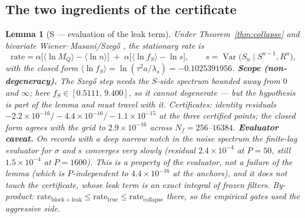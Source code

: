 \documentclass[11pt]{article}
\newtheorem{lemma}{Lemma}
\theoremstyle{definition}
\theoremstyle{remark}
\begin{document}
\subsection{The two ingredients of the certificate}

\begin{lemma}[S --- evaluation of the leak term]
\label{lem:S}
Under Theorem~\ref{thm:collapse} and bivariate Wiener--Masani/Szeg\H o
\cite{bib:wm57,bib:wm58,bib:hl58},
the stationary rate is
\[
\mathrm{rate}=\alpha\bigl[\langle\ln M_Q\rangle-\langle\ln
n\rangle\bigr]
\;+\;\alpha\bigl[\langle\ln f_S\rangle-\ln s\bigr],
\qquad s=\operatorname{Var}\bigl(S_u\mid S^{u-1},R^{u}\bigr),
\]
with the closed form
$\langle\ln f_S\rangle=\ln(\tau^2a/\lambda_s)=-0.1025391956$.
\textbf{Scope (non-degeneracy).} The Szeg\H o step needs the $S$-side
spectrum bounded away from $0$ and $\infty$; here
$f_S\in[0.5111,\,9.400]$, so it cannot degenerate --- but the
hypothesis is part of the lemma and must travel with it.
\emph{Certificates:} identity residuals
$-2.2\times10^{-16}/-4.4\times10^{-16}/-1.1\times10^{-15}$ at the three
certified points; the closed form agrees with the grid to
$2.9\times10^{-16}$ across $N_f=256$--$16384$.
\textbf{Evaluator caveat.} On records with a deep narrow notch in the
noise spectrum the \emph{finite-lag} evaluator for $\sigma$ and $s$
converges very slowly (residual $2.4\times10^{-4}$ at $P=50$, still
$1.5\times10^{-4}$ at $P=1600$). This is a property of the
\emph{evaluator}, not a failure of the lemma (which is
$P$-independent to $4.4\times10^{-16}$ at the anchors), and it does not
touch the certificate, whose leak term is an exact integral of
\emph{frozen} filters. By-product:
$\mathrm{rate}_{\mathrm{block+leak}}\le
\mathrm{rate}_{\mathrm{true}}\le\mathrm{rate}_{\mathrm{collapse}}$
there, so the empirical gates used the aggressive side.
\end{lemma}
\end{document}
